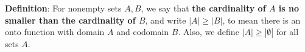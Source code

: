 
{\bf Definition}:  For nonempty sets $A, B$, we say that {\bf the  cardinality of $A$ is  no  smaller than 
the cardinality of  $B$}, and 
write $|A| \geq |B|$, to mean there is an onto function  with domain $A$  and codomain $B$.
Also, we define $|A| \geq |\emptyset|$ for all sets $A$.
